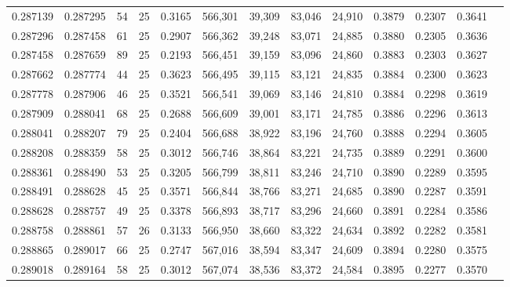 \begin{tabular}{rrrrrrrrrrrrr}
0.287139 & 0.287295 &    54 &  25 &                                     0.3165 & 566,301 &  39,309 &  83,046 &  24,910 & 0.3879 & 0.2307 & 0.3641 \\
0.287296 & 0.287458 &    61 &  25 &                                     0.2907 & 566,362 &  39,248 &  83,071 &  24,885 & 0.3880 & 0.2305 & 0.3636 \\
0.287458 & 0.287659 &    89 &  25 &                                     0.2193 & 566,451 &  39,159 &  83,096 &  24,860 & 0.3883 & 0.2303 & 0.3627 \\
0.287662 & 0.287774 &    44 &  25 &                                     0.3623 & 566,495 &  39,115 &  83,121 &  24,835 & 0.3884 & 0.2300 & 0.3623 \\
0.287778 & 0.287906 &    46 &  25 &                                     0.3521 & 566,541 &  39,069 &  83,146 &  24,810 & 0.3884 & 0.2298 & 0.3619 \\
0.287909 & 0.288041 &    68 &  25 &                                     0.2688 & 566,609 &  39,001 &  83,171 &  24,785 & 0.3886 & 0.2296 & 0.3613 \\
0.288041 & 0.288207 &    79 &  25 &                                     0.2404 & 566,688 &  38,922 &  83,196 &  24,760 & 0.3888 & 0.2294 & 0.3605 \\
0.288208 & 0.288359 &    58 &  25 &                                     0.3012 & 566,746 &  38,864 &  83,221 &  24,735 & 0.3889 & 0.2291 & 0.3600 \\
0.288361 & 0.288490 &    53 &  25 &                                     0.3205 & 566,799 &  38,811 &  83,246 &  24,710 & 0.3890 & 0.2289 & 0.3595 \\
0.288491 & 0.288628 &    45 &  25 &                                     0.3571 & 566,844 &  38,766 &  83,271 &  24,685 & 0.3890 & 0.2287 & 0.3591 \\
0.288628 & 0.288757 &    49 &  25 &                                     0.3378 & 566,893 &  38,717 &  83,296 &  24,660 & 0.3891 & 0.2284 & 0.3586 \\
0.288758 & 0.288861 &    57 &  26 &                                     0.3133 & 566,950 &  38,660 &  83,322 &  24,634 & 0.3892 & 0.2282 & 0.3581 \\
0.288865 & 0.289017 &    66 &  25 &                                     0.2747 & 567,016 &  38,594 &  83,347 &  24,609 & 0.3894 & 0.2280 & 0.3575 \\
0.289018 & 0.289164 &    58 &  25 &                                     0.3012 & 567,074 &  38,536 &  83,372 &  24,584 & 0.3895 & 0.2277 & 0.3570 \\

\end{tabular}
